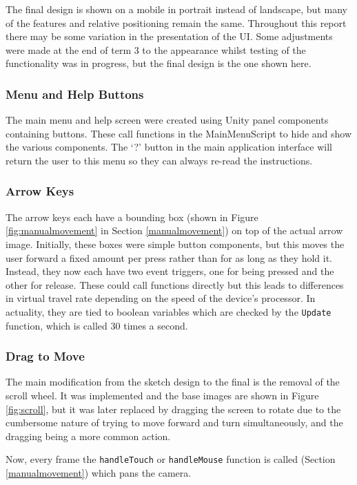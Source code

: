 \documentclass[12pt, a4paper]{article}
\begin{document}
The final design is shown on a mobile in portrait instead of landscape, but many of the features and relative positioning remain the same. Throughout this report there may be some variation in the presentation of the UI. Some adjustments were made at the end of term 3 to the appearance whilst testing of the functionality was in progress, but the final design is the one shown here. 

\subsubsection{Menu and Help Buttons}
The main menu and help screen were created using Unity panel components containing buttons. These call functions in the MainMenuScript to hide and show the various components. The `?' button in the main application interface will return the user to this menu so they can always re-read the instructions.

\subsubsection{Arrow Keys}
The arrow keys each have a bounding box (shown in Figure \ref{fig:manualmovement} in Section \ref{manualmovement}) on top of the actual arrow image. Initially, these boxes were simple button components, but this moves the user forward a fixed amount per press rather than for as long as they hold it. Instead, they now each have two event triggers, one for being pressed and the other for release. These could call functions directly but this leads to differences in virtual travel rate depending on the speed of the device's processor. In actuality, they are tied to boolean variables which are checked by the \verb|Update| function, which is called 30 times a second.

\subsubsection{Drag to Move}
The main modification from the sketch design to the final is the removal of the scroll wheel. It was implemented and the base images are shown in Figure \ref{fig:scroll}, but it was later replaced by dragging the screen to rotate due to the cumbersome nature of trying to move forward and turn simultaneously, and the dragging being a more common action.

Now, every frame the \verb|handleTouch| or \verb|handleMouse| function is called (Section \ref{manualmovement}) which pans the camera.
\end{document}
